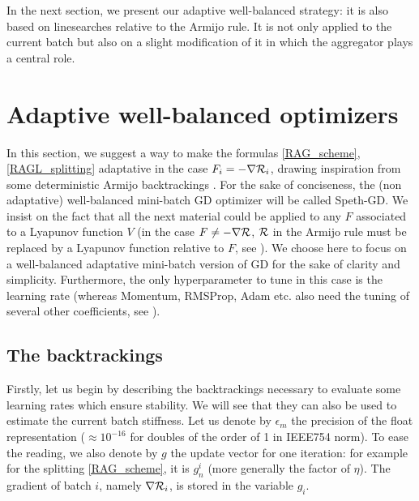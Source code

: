 In the next section, we present our adaptive well-balanced strategy: it is also based on linesearches relative to the Armijo rule. 
It is not only applied to the current batch but also on a slight
modification of it in which the aggregator plays a central role. 



\section{Adaptive well-balanced optimizers}
\label{section_optimizers}

In this section, we suggest a way to make the formulas \eqref{RAG_scheme}, \eqref{RAGL_splitting} %
adaptative in the case $F_i=-\nabla \mathcal{R}_i$, drawing inspiration from some deterministic Armijo backtrackings \cite{armijo,Rondepierre,Lyap_Theory_Bilel,Bilel_thesis}. 
For the sake of conciseness, the (non adaptative) well-balanced mini-batch GD optimizer will be called Speth-GD. 
We insist on the fact that all the next material could be applied to any $F$ associated to a Lyapunov function $V$ (in the case $F\neq-\nabla \mathcal{R}$, $\mathcal{R}$ in the Armijo rule must be
replaced by a Lyapunov function relative to $F$, see \cite{Lyap_Theory_Bilel,Bilel_thesis}). We choose here to focus on a well-balanced adaptative mini-batch version of GD for the sake of clarity and simplicity. Furthermore, the only hyperparameter to tune in this case is the learning rate (whereas Momentum, RMSProp, Adam etc. also need the tuning of several other coefficients, see \cite{Bilel_thesis}). 

\subsection{The backtrackings}
Firstly, let us begin by describing the backtrackings necessary to evaluate some learning rates which ensure stability. 
We will see that they can also be used to estimate the current batch stiffness. 
Let us denote by $\epsilon_m$ the precision of the float representation
($\approx 10^{-16}$ for doubles of the order of 1 in IEEE754 norm). To ease the reading, we also denote by $g$ the update vector for one iteration: for example for the splitting \eqref{RAG_scheme}, it is
$g_n^i$ (more generally the factor of $\eta$). The gradient of batch $i$, namely $\nabla \mathcal{R}_i$, is stored in the variable $g_i$. 


